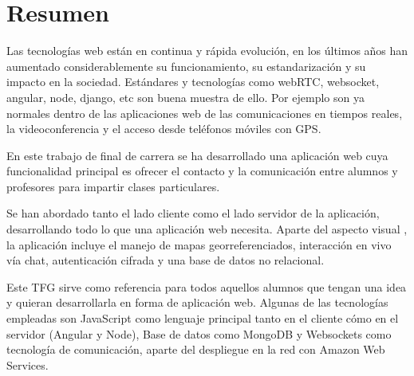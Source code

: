 \documentclass[oneside,a4paper,11pt]{book}
\begin{document}
\clearpage
\thispagestyle{empty}

\vspace{5cm}




\chapter*{Resumen}
\pagestyle{plain}

Las tecnologías web están en continua y rápida evolución, en los últimos años han aumentado considerablemente su funcionamiento, su estandarización y su impacto en la sociedad. Estándares y tecnologías como webRTC, websocket, angular, node, django, etc son buena muestra de ello. Por ejemplo son ya normales dentro de las aplicaciones web de las comunicaciones en tiempos reales, la videoconferencia y el acceso desde teléfonos móviles con GPS.

En este trabajo de final de carrera se ha desarrollado una aplicación web cuya funcionalidad principal es ofrecer el contacto y la comunicación entre alumnos y profesores para impartir clases particulares.

Se han abordado tanto el lado cliente como el lado servidor de la aplicación, desarrollando todo lo que una aplicación web necesita. Aparte del aspecto visual , la aplicación incluye el manejo de mapas georreferenciados, interacción en vivo vía chat, autenticación cifrada y una base de datos no relacional.

Este TFG sirve como referencia para todos aquellos alumnos que tengan una idea y quieran desarrollarla en forma de aplicación web. Algunas de las tecnologías empleadas son JavaScript como lenguaje principal tanto en el cliente cómo en el servidor (Angular y Node), Base de datos como MongoDB y Websockets como tecnología de comunicación, aparte del despliegue en la red con Amazon Web Services.
\end{document}
